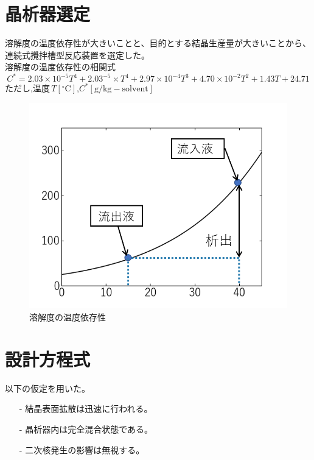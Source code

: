 \documentclass[a4j]{jsreport}
\begin{document}
\section{晶析器選定}
溶解度の温度依存性が大きいことと、目的とする結晶生産量が大きいことから、
連続式攪拌槽型反応装置を選定した。\\
溶解度の温度依存性の相関式
\begin{equation}
    C^*=2.03\times 10^{-5}T^4 +2.03^{-5}\times T^4 + 2.97\times 10^{-4}T^3 + 4.70\times 10^{-2}T^2
        + 1.43T + 24.71
\end{equation}
ただし,温度\,$T[\mathrm{^\circ C}]$,$C^*[\mathrm{g/kg-solvent}]$\\
\begin{figure}[h]
    \label{溶解度の温度依存性}
    \begin{center}
        \includegraphics[scale=0.7]{BzAsolvent.png}
        \caption{溶解度の温度依存性}
    \end{center}
\end{figure}


\section{設計方程式}
以下の仮定を用いた。
\begin{itemize}
    \setlength{\parskip}{0pt}
    \setlength{\itemsep}{2pt} 
    \item[-] 結晶表面拡散は迅速に行われる。
    \item[-] 晶析器内は完全混合状態である。
    \item[-] 二次核発生の影響は無視する。
\end{itemize}
\end{document}
